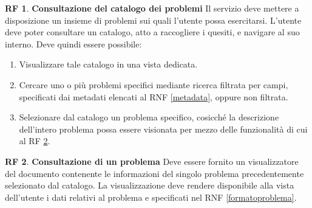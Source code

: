 \documentclass[11pt, a4paper]{article}
\theoremstyle{definition}
\newtheorem{funcreq}{RF} %
\begin{document}
\begin{funcreq}
\label{probcatalogue}
\textbf{Consultazione del catalogo dei problemi }
Il servizio deve mettere a disposizione un insieme di problemi sui quali
l'utente possa esercitarsi. L'utente deve poter consultare un catalogo,
atto a raccogliere i quesiti, e navigare al suo interno. Deve quindi
essere possibile:
\begin{enumerate}
    \item Visualizzare tale catalogo in una vista dedicata.
    
    \item Cercare uno o più problemi specifici mediante ricerca filtrata
    per campi, specificati dai metadati elencati al RNF \ref{metadata},
    oppure non filtrata.

    \item Selezionare dal catalogo un problema specifico, cosicché la
    descrizione dell'intero problema possa essere visionata per mezzo
    delle funzionalità di cui al RF \ref{seeproblem}.
\end{enumerate}
\end{funcreq}

\begin{funcreq}
\label{seeproblem}
\textbf{Consultazione di un problema }
Deve essere fornito un visualizzatore del documento contenente le
informazioni del singolo problema precedentemente selezionato dal
catalogo. La visualizzazione deve rendere disponibile alla vista
dell'utente i dati relativi al problema e specificati nel RNF
\ref{formatoproblema}.
\end{funcreq}
\end{document}
